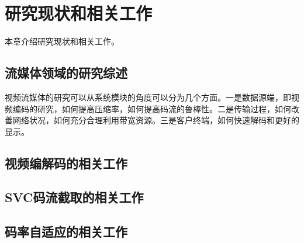 \chapter{研究现状和相关工作}
本章介绍研究现状和相关工作。

\section{流媒体领域的研究综述}

视频流媒体的研究可以从系统模块的角度可以分为几个方面。一是数据源端，即视频编码的研究，如何提高压缩率，如何提高码流的鲁棒性。二是传输过程，如何改善网络状况，如何充分合理利用带宽资源。三是客户终端，如何快速解码和更好的显示。

\section{视频编解码的相关工作}

\section{SVC码流截取的相关工作}

\section{码率自适应的相关工作}